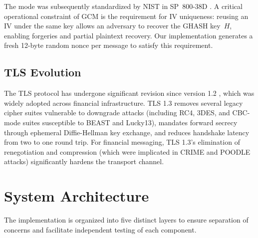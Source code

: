 \documentclass[twocolumn,10pt]{article}
\begin{document}
The mode was subsequently standardized by NIST in SP~800-38D \cite{nist80038d}.
A critical operational constraint of GCM is the requirement for IV uniqueness:
reusing an IV under the same key allows an adversary to recover the GHASH
key~$H$, enabling forgeries and partial plaintext recovery. Our implementation
generates a fresh 12-byte random nonce per message to satisfy this requirement.

\subsection{TLS Evolution}

The TLS protocol has undergone significant revision since version 1.2
\cite{rfc5246}, which was widely adopted across financial infrastructure.
TLS 1.3 \cite{rfc8446} removes several legacy cipher suites vulnerable to
downgrade attacks (including RC4, 3DES, and CBC-mode suites susceptible to
BEAST and Lucky13), mandates forward secrecy through ephemeral Diffie-Hellman
key exchange, and reduces handshake latency from two to one round trip. For
financial messaging, TLS 1.3's elimination of renegotiation and compression
(which were implicated in CRIME and POODLE attacks) significantly hardens
the transport channel.

\section{System Architecture}

The implementation is organized into five distinct layers to ensure separation
of concerns and facilitate independent testing of each component.
\end{document}
